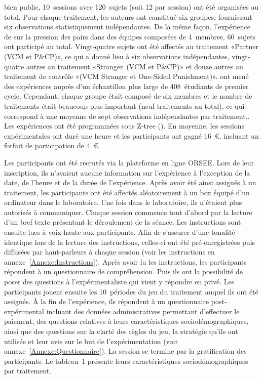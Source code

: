 \begin{Article}
\begin{refsection}[Lebourges]
{  bien public, 10~sessions avec 120~sujets (soit 12 par session) ont été
  organisées au total. Pour chaque traitement, les auteurs ont constitué
  six groupes, fournissant six observations statistiquement
  indépendantes. De la même façon, l'expérience de \textcite{Nikiforakis2008} sur la pression des pairs dans des équipes composées de
  4~membres, 60~sujets ont participé au total. Vingt-quatre sujets ont
  été affectés au traitement «Partner (VCM et P\&CP)», ce qui a donné
  lieu à six observations indépendantes, vingt-quatre autres au
  traitement «Stranger~(VCM et P\&CP)» et douze autres au traitement
  de contrôle «(VCM Stranger et One-Sided Punishment)». \textcite{NalbantianSchotter1997} ont mené des expériences auprès d'un échantillon
  plus large de 408~étudiants de premier cycle. Cependant, chaque groupe
  était composé de six membres et le nombre de traitements était
  beaucoup plus important (neuf traitements au total), ce qui correspond
  à une moyenne de sept observations indépendantes par traitement.}. Les
expériences ont été programmées sous Z-tree (\textcite{Fischbacher2007}). En
moyenne, les sessions expérimentales ont duré une heure et les
participants ont gagné 16~€, incluant un forfait de participation de
4~€.

Les participants ont été recrutés via la plateforme en ligne ORSEE. Lors
de leur inscription, ils n'avaient aucune information sur l'expérience à
l'exception de la date, de l'heure et de la durée de l'expérience. Après
avoir été ainsi assignés à un traitement, les participants ont été
affectés aléatoirement à un box équipé d'un ordinateur dans le
laboratoire. Une fois dans le laboratoire, ils n'étaient plus autorisés
à communiquer. Chaque session commence tout d'abord par la lecture d'un
bref texte présentant le déroulement de la séance. Les instructions sont
ensuite lues à voix haute aux participants. Afin de s'assurer d'une
tonalité identique lors de la lecture des instructions, celles-ci ont
été pré-enregistrées puis diffusées par haut-parleurs à chaque session
(voir les instructions en annexe~\ref{Annexe:Instructions}). Après avoir lu les instructions,
les participants répondent à un questionnaire de compréhension. Puis ils
ont la possibilité de poser des questions à l'expérimentaliste qui vient
y répondre en privé. Les participants jouent ensuite les 10~périodes du
jeu du traitement auquel ils ont été assignés. À la fin de l'expérience,
ils répondent à un questionnaire post-expérimental incluant des données
administratives permettant d'effectuer le paiement, des questions
relatives à leurs caractéristiques sociodémographiques, ainsi que des
questions sur la clarté des règles du jeu, la stratégie qu'ils ont
utilisée et leur avis sur le but de l'expérimentation (voir annexe~\ref{Annexe:Questionnaire}).
La session se termine par la gratification des participants. Le
tableau~1 présente leurs caractéristiques sociodémographiques par
traitement.


\end{refsection}
\end{Article}
